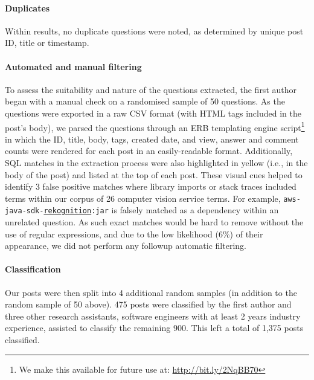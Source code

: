 \paragraph{Duplicates} Within \NumPostsFromSO{} results, no duplicate questions were noted, as determined by unique post ID, title or timestamp.

\paragraph{Automated and manual filtering}
\label{icse2020:ssec:method:filtering:automated-manual-filtering}

To assess the suitability and nature of the \NumPostsFromSO{} questions extracted, the first author began with a manual check on a randomised sample of 50 questions. As the questions were exported in a raw CSV format (with HTML tags included in the post's body), we parsed the questions through an ERB templating engine script\footnote{We make this available for future use at: \url{http://bit.ly/2NqBB70}} in which the ID, title, body, tags, created date, and view, answer and comment counts were rendered for each post in an easily-readable format. %
Additionally, SQL matches in the extraction process were also highlighted in yellow (i.e., in the body of the post) and listed at the top of each post. These visual cues helped to identify 3 false positive matches where library imports or stack traces included terms within our corpus of 26 computer vision service terms. For example, \texttt{aws-java-sdk-\underline{rekognition}:jar} is falsely matched as a dependency within an unrelated question. As such exact matches would be hard to remove without the use of regular expressions, and due to the low likelihood (6\%) of their appearance, we did not perform any followup automatic filtering.

\paragraph{Classification}
\label{icse2020:ssec:method:filtering:classification}

Our \NumPostsFromSO{} posts were then split into 4 additional random samples (in addition to the random sample of 50 above). 475 posts were classified by the first author and three other research assistants, software engineers with at least 2 years industry experience, assisted to classify the remaining 900. This left a total of 1,375 posts classified.

